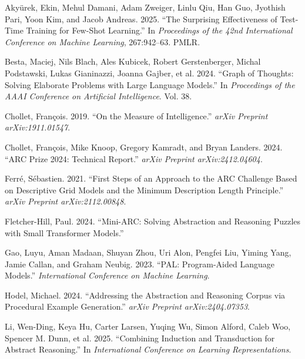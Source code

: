 \documentclass[11pt]{article}
\newlength{\cslhangindent}
\newenvironment{CSLReferences}[2] %
  {\setlength{\parindent}{0pt}%
   \setlength{\parskip}{#2\baselineskip}%
   \ifodd #1\relax
     \setlength{\leftskip}{\cslhangindent}%
     \setlength{\parindent}{-\cslhangindent}%
   \fi}
  {}
\begin{document}
\hypertarget{refs}{}
\begin{CSLReferences}{1}{0}
\leavevmode{}%
Akyürek, Ekin, Mehul Damani, Adam Zweiger, Linlu Qiu, Han Guo, Jyothish
Pari, Yoon Kim, and Jacob Andreas. 2025. {``The Surprising Effectiveness
of Test-Time Training for Few-Shot Learning.''} In \emph{Proceedings of
the 42nd International Conference on Machine Learning}, 267:942--63.
PMLR.

\leavevmode{}%
Besta, Maciej, Nils Blach, Ales Kubicek, Robert Gerstenberger, Michal
Podstawski, Lukas Gianinazzi, Joanna Gajber, et al. 2024. {``Graph of
Thoughts: Solving Elaborate Problems with Large Language Models.''} In
\emph{Proceedings of the AAAI Conference on Artificial Intelligence}.
Vol. 38.

\leavevmode{}%
Chollet, François. 2019. {``On the Measure of Intelligence.''}
\emph{arXiv Preprint arXiv:1911.01547}.

\leavevmode{}%
Chollet, François, Mike Knoop, Gregory Kamradt, and Bryan Landers. 2024.
{``{ARC Prize 2024}: Technical Report.''} \emph{arXiv Preprint
arXiv:2412.04604}.

\leavevmode{}%
Ferré, Sébastien. 2021. {``First Steps of an Approach to the {ARC}
Challenge Based on Descriptive Grid Models and the Minimum Description
Length Principle.''} \emph{arXiv Preprint arXiv:2112.00848}.

\leavevmode{}%
Fletcher-Hill, Paul. 2024. {``Mini-{ARC}: Solving Abstraction and
Reasoning Puzzles with Small Transformer Models.''}

\leavevmode{}%
Gao, Luyu, Aman Madaan, Shuyan Zhou, Uri Alon, Pengfei Liu, Yiming Yang,
Jamie Callan, and Graham Neubig. 2023. {``{PAL}: Program-Aided Language
Models.''} \emph{International Conference on Machine Learning}.

\leavevmode{}%
Hodel, Michael. 2024. {``Addressing the Abstraction and Reasoning Corpus
via Procedural Example Generation.''} \emph{arXiv Preprint
arXiv:2404.07353}.

\leavevmode{}%
Li, Wen-Ding, Keya Hu, Carter Larsen, Yuqing Wu, Simon Alford, Caleb
Woo, Spencer M. Dunn, et al. 2025. {``Combining Induction and
Transduction for Abstract Reasoning.''} In \emph{International
Conference on Learning Representations}.


\end{CSLReferences}
\end{document}
